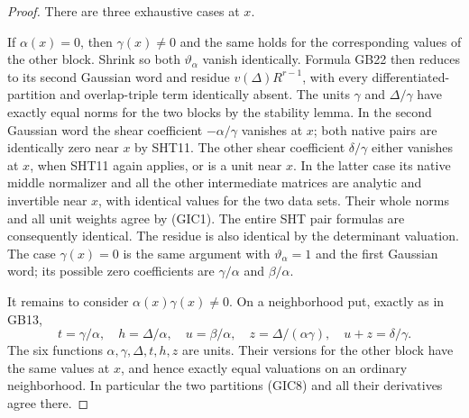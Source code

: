 \begin{proof}
There are three exhaustive cases at $x$.

If $\alpha(x)=0$, then $\gamma(x)\ne0$ and the same holds
for the corresponding values of the other block.  Shrink so
both $\vartheta_\alpha$ vanish identically.  Formula GB22
then reduces to its second Gaussian word and residue
$v(\Delta)R^{r-1}$, with every differentiated-partition and
overlap-triple term identically absent.  The units $\gamma$
and $\Delta/\gamma$ have exactly equal norms for the two
blocks by the stability lemma.  In the second Gaussian word
the shear coefficient $-\alpha/\gamma$ vanishes at $x$;
both native pairs are identically zero near $x$ by SHT11.
The other shear coefficient $\delta/\gamma$ either vanishes
at $x$, when SHT11 again applies, or is a unit near $x$.
In the latter case its native middle normalizer and all the
other intermediate matrices are analytic and invertible near
$x$, with identical values for the two data sets.  Their
whole norms and all unit weights agree by (GIC1).
The entire SHT pair formulas are consequently identical.
The residue is also identical by the determinant valuation.
The case $\gamma(x)=0$ is the same argument with
$\vartheta_\alpha=1$ and the first Gaussian word; its possible
zero coefficients are $\gamma/\alpha$ and $\beta/\alpha$.

It remains to consider $\alpha(x)\gamma(x)\ne0$.
On a neighborhood put, exactly as in GB13,
\[
 t=\gamma/\alpha,\quad h=\Delta/\alpha,\quad
 u=\beta/\alpha,\quad z=\Delta/(\alpha\gamma),\quad
                         u+z=\delta/\gamma.
 \tag{GIC12}
\]
The six functions $\alpha,\gamma,\Delta,t,h,z$
are units.  Their versions for the other block have the same
values at $x$, and hence exactly equal valuations on an
ordinary neighborhood.  In particular the two partitions
(GIC8) and all their derivatives agree there.


\end{proof}

